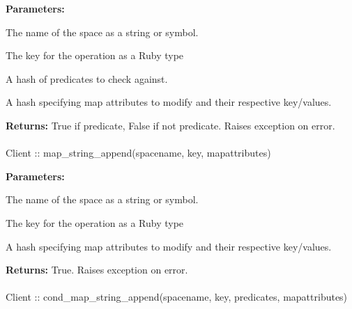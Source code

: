 \noindent\textbf{Parameters:}
\begin{description}[labelindent=\widthof{{\code{mapattributes}}},leftmargin=*,noitemsep,nolistsep,align=right]
\item[\code{spacename}] The name of the space as a string or symbol.
\item[\code{key}] The key for the operation as a Ruby type
\item[\code{predicates}] A hash of predicates to check against.
\item[\code{mapattributes}] A hash specifying map attributes to modify and their respective key/values.
\end{description}

\noindent\textbf{Returns:}
True if predicate, False if not predicate.  Raises exception on error.

\paragraph{}
\label{api:ruby:map_string_append}
\begin{rubycode}
Client :: map_string_append(spacename, key, mapattributes)
\end{rubycode}


\noindent\textbf{Parameters:}
\begin{description}[labelindent=\widthof{{\code{mapattributes}}},leftmargin=*,noitemsep,nolistsep,align=right]
\item[\code{spacename}] The name of the space as a string or symbol.
\item[\code{key}] The key for the operation as a Ruby type
\item[\code{mapattributes}] A hash specifying map attributes to modify and their respective key/values.
\end{description}

\noindent\textbf{Returns:}
True.  Raises exception on error.

\paragraph{}
\label{api:ruby:cond_map_string_append}
\begin{rubycode}
Client :: cond_map_string_append(spacename, key, predicates, mapattributes)
\end{rubycode}


